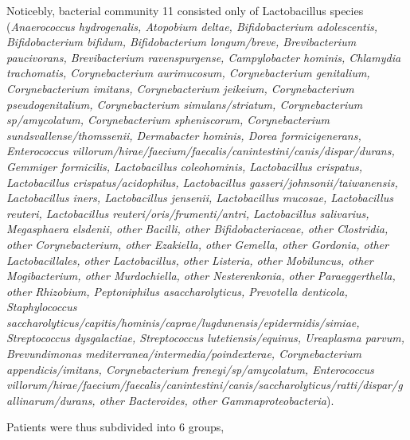 \documentclass[
]{article}
\begin{document}
Noticebly, bacterial community 11 consisted only of Lactobacillus species (\emph{Anaerococcus hydrogenalis, Atopobium deltae, Bifidobacterium adolescentis, Bifidobacterium bifidum, Bifidobacterium longum/breve, Brevibacterium paucivorans, Brevibacterium ravenspurgense, Campylobacter hominis, Chlamydia trachomatis, Corynebacterium aurimucosum, Corynebacterium genitalium, Corynebacterium imitans, Corynebacterium jeikeium, Corynebacterium pseudogenitalium, Corynebacterium simulans/striatum, Corynebacterium sp/amycolatum, Corynebacterium spheniscorum, Corynebacterium sundsvallense/thomssenii, Dermabacter hominis, Dorea formicigenerans, Enterococcus villorum/hirae/faecium/faecalis/canintestini/canis/dispar/durans, Gemmiger formicilis, Lactobacillus coleohominis, Lactobacillus crispatus, Lactobacillus crispatus/acidophilus, Lactobacillus gasseri/johnsonii/taiwanensis, Lactobacillus iners, Lactobacillus jensenii, Lactobacillus mucosae, Lactobacillus reuteri, Lactobacillus reuteri/oris/frumenti/antri, Lactobacillus salivarius, Megasphaera elsdenii, other Bacilli, other Bifidobacteriaceae, other Clostridia, other Corynebacterium, other Ezakiella, other Gemella, other Gordonia, other Lactobacillales, other Lactobacillus, other Listeria, other Mobiluncus, other Mogibacterium, other Murdochiella, other Nesterenkonia, other Paraeggerthella, other Rhizobium, Peptoniphilus asaccharolyticus, Prevotella denticola, Staphylococcus saccharolyticus/capitis/hominis/caprae/lugdunensis/epidermidis/simiae, Streptococcus dysgalactiae, Streptococcus lutetiensis/equinus, Ureaplasma parvum, Brevundimonas mediterranea/intermedia/poindexterae, Corynebacterium appendicis/imitans, Corynebacterium freneyi/sp/amycolatum, Enterococcus villorum/hirae/faecium/faecalis/canintestini/canis/saccharolyticus/ratti/dispar/gallinarum/durans, other Bacteroides, other Gammaproteobacteria}).

Patients were thus subdivided into 6 groups,
\end{document}
